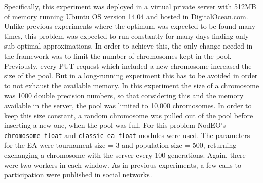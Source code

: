 \documentclass{sig-alternate}
\begin{document}
Specifically, this experiment was deployed in a virtual private server with 512MB of memory
running Ubuntu OS version 14.04 and hosted in DigitalOcean.com. Unlike previous
experiments where the optimum was expected to be found many times, 
this problem was expected to run constantly for many days finding only
sub-optimal approximations. In order to achieve this, the only change needed 
in the framework was to limit the number of chromosomes kept in the pool. 
Previously, every PUT request which included a new chromosome increased 
the size of the pool. But in a long-running experiment this has to be avoided
in order to not exhaust the available memory. In this experiment the size
of a chromosome was 1000 double precision numbers, so that considering this
and the memory available in the server, the pool was limited 
to 10,000 chromosomes.  In order to keep this size
constant, a random chromosome was pulled out of the pool before inserting a
new one, when the pool was full. For this problem {\sf NodEO}'s {\tt chromosome-float} 
and {\tt classic-ea-float} modules were used. The parameters for the EA 
were tournament size = 3 and  population size = 500, returning exchanging a
chromosome with the server every 100 generations. Again, there were two workers in each window.
As in previous experiments, a few calls to participation were published in social networks.
\end{document}

